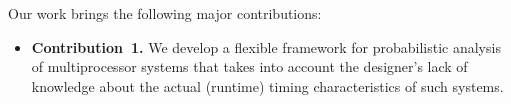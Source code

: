 Our work brings the following major contributions:
\begin{itemize}

\item \textbf{Contribution~1.} We develop a flexible framework for probabilistic
  analysis of multiprocessor systems that takes into account the designer's lack
  of knowledge about the actual (runtime) timing characteristics of such
  systems.

\end{itemize}
